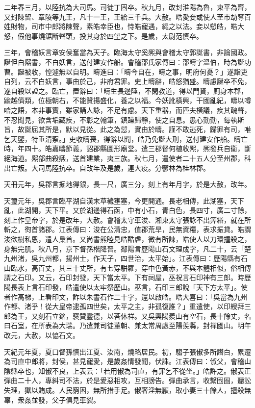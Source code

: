 \begin{pinyinscope}
二年春三月，以陸抗為大司馬。司徒丁固卒。秋九月，改封淮陽為魯，東平為齊，又封陳留、章陵等九王，凡十一王，王給三千兵。大赦。皓愛妾或使人至市劫奪百姓財物，司市中郎將陳聲，素皓幸臣也，恃皓寵遇，繩之以法。妾以愬皓，皓大怒，假他事燒鋸斷聲頭，投其身於四望之下。是歲，太尉范慎卒。

三年，會稽妖言章安侯奮當為天子。臨海太守奚熈與會稽太守郭誕書，非論國政。誕但白熈書，不白妖言，送付建安作船。會稽邵氏家傳曰：邵疇字溫伯，時為誕功曹。誕被收，惶遽無以自明。疇進曰：「疇今自在，疇之事，明府何憂？」遂詣吏自列，云不白妖言，事由於己，非府君罪。吏上疇辭，皓怒猶盛。疇慮誕卒不免，遂自殺以證之。臨亡，置辭曰：「疇生長邊陲，不閑教道，得以門資，厠身本郡，踰越儕類，位極朝右，不能贊揚盛化，養之以福。今妖訛橫興，干國亂紀，疇以噂𠴲之語，本非事實，雖家誦人詠，不足有慮。天下重器，而匹夫橫議，疾其醜聲，不忍聞見，欲含垢藏疾，不彰之翰筆，鎮躁歸靜，使之自息。愚心勤勤，每執斯旨，故誕屈其所是，默以見從。此之為愆，實由於疇。謹不敢逃死，歸罪有司，唯乞天鑒，特垂清察。」吏收疇喪，得辭以聞，皓乃免誕大刑，送付建安作船。疇亡時，年四十。皓嘉疇節義，詔郡縣圖形廟堂。遣三郡督何植收熈，熈發兵自衞，斷絕海道。熈部曲殺熈，送首建業，夷三族。秋七月，遣使者二十五人分至州郡，科出亡叛。大司馬陸抗卒。自改年及是歲，連大疫。分鬱林為桂林郡。

天冊元年，吳郡言掘地得銀，長一尺，廣三分，刻上有年月字，於是大赦，改年。

天璽元年，吳郡言臨平湖自漢末草穢壅塞，今更開通。長老相傳，此湖塞，天下亂，此湖開，天下平。又於湖邊得石函，中有小石，青白色，長四寸，廣二寸餘，刻上作皇帝字，於是改年，大赦。會稽太守車浚、湘東太守張詠不出筭緡，就在所斬之，徇首諸郡。江表傳曰：浚在公清忠，值郡荒旱，民無資糧，表求振貸。皓謂浚欲樹私恩，遣人梟首。又尚書熊睦見皓酷虐，微有所諫，皓使人以刀環撞殺之，身無完肌。秋八月，京下督孫楷降晉。鄱陽言歷陽山石文理成字，凡二十，云「楚九州渚，吳九州都，揚州士，作天子，四世治，太平始」。江表傳曰：歷陽縣有石山臨水，高百丈，其三十丈所，有七穿駢羅，穿中色黃赤，不與本體相似，俗相傳謂之石印。又云，石印封發，天下當太平。下有祠屋，巫祝言石印神有三郎。時歷陽長表上言石印發，皓遣使以太牢祭歷山。巫言，石印三郎說「天下方太平」。使者作高梯，上看印文，詐以朱書石作二十字，還以啟皓。皓大喜曰：「吳當為九州作都、渚乎！從大皇帝逮孤四世矣，太平之主，非孤復誰？」重遣使，以印綬拜三郎為王，又刻石立銘，襃贊靈德，以荅休祥。又吳興陽羨山有空石，長十餘丈，名曰石室，在所表為大瑞。乃遣兼司徒董朝、兼太常周處至陽羨縣，封襌國山。明年改元，大赦，以恊石文。

天紀元年夏，夏口督孫慎出江夏、汝南，燒略居民。初，騶子張俶多所譖白，累遷為司直中郎將，封侯，甚見寵愛，是歲姦情發聞，伏誅。江表傳曰：俶父，會稽山陰縣卒也，知俶不良，上表云：「若用俶為司直，有罪乞不從坐。」皓許之。俶表正彈曲二十人，專糾司不法，於是愛惡相攻，互相謗告。彈曲承言，收繫囹圄，聽訟失理，獄以賄成。人民窮困，無所措手足。俶奢淫無厭，取小妻三十餘人，擅殺無辜，衆姦並發，父子俱見車裂。


\end{pinyinscope}
